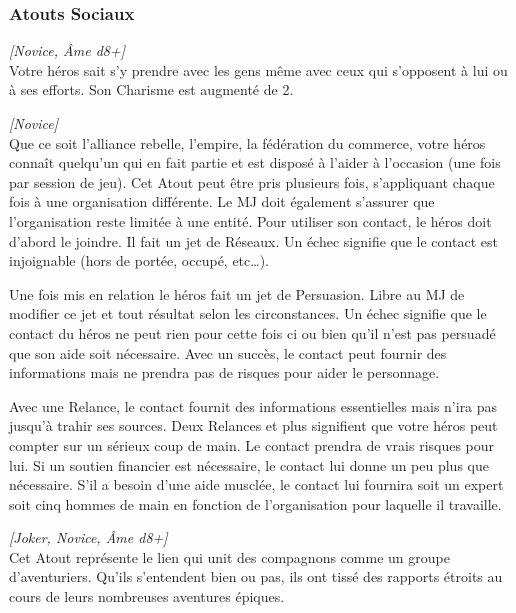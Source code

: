 \newpage
\subsubsection{Atouts Sociaux}

\begin{description}[align=left]

    \item [Charismatique]
        \emph{[Novice, Âme d8+]}\\
        Votre héros sait s’y prendre avec les gens même avec ceux qui s’opposent à lui ou à ses efforts. Son Charisme est augmenté de 2.

    \item [Contacts]
        \emph{[Novice]}\\
        Que ce soit l’alliance rebelle, l’empire, la fédération du commerce, votre héros connaît quelqu’un qui en fait partie et est disposé à l’aider à l’occasion (une fois par session de jeu). Cet Atout peut être pris plusieurs fois, s’appliquant chaque fois à une organisation différente. Le MJ doit également s’assurer que l’organisation reste limitée à une entité. Pour utiliser son contact, le héros doit d’abord le joindre. Il fait un jet de Réseaux. Un échec signifie que le contact est injoignable (hors de portée, occupé, etc\ldots).

        Une fois mis en relation le héros fait un jet de Persuasion. Libre au MJ de modifier ce jet et tout résultat selon les circonstances. Un échec signifie que le contact du héros ne peut rien pour cette fois ci ou bien qu’il n’est pas persuadé que son aide soit nécessaire. Avec un succès, le contact peut fournir des informations mais ne prendra pas de risques pour aider le personnage.

        Avec une Relance, le contact fournit des informations essentielles mais n’ira pas jusqu’à trahir ses sources. Deux Relances et plus signifient que votre héros peut compter sur un sérieux coup de main. Le contact prendra de vrais risques pour lui. Si un soutien financier est nécessaire, le contact lui donne un peu plus que nécessaire. S’il a besoin d’une aide musclée, le contact lui fournira soit un expert soit cinq hommes de main en fonction de l’organisation pour laquelle il travaille.

    \item [Lien mutuel]
        \emph{[Joker, Novice, Âme d8+]}\\
        Cet Atout représente le lien qui unit des compagnons comme un groupe d’aventuriers. Qu’ils s’entendent bien ou pas, ils ont tissé des rapports étroits au cours de leurs nombreuses aventures épiques.


\end{description}
